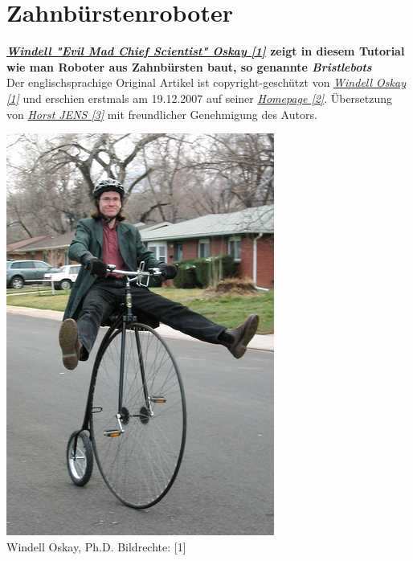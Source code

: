 \section*{Zahnbürstenroboter} 
\label{bristlebot}


\textbf{\href{http://www.evilmadscientist.com/about/}{\textit{Windell "Evil Mad Chief Scientist" Oskay [1]}} zeigt in diesem Tutorial wie man Roboter aus Zahnbürsten baut, so genannte \textit{Bristlebots}} \\

Der englischsprachige Original Artikel ist copyright-geschützt von \href{http://www.evilmadscientist.com/about/}{\textit{Windell Oskay [1]}} und erschien erstmals am 19.12.2007 auf seiner \href{http://www.evilmadscientist.com/go/bristlebot}{\textit{Homepage [2]}}. Übersetzung von \href{http://spielend-programmieren.at}{\textit{Horst JENS [3]}} mit freundlicher Genehmigung des Autors.

\begin{center}
\includegraphics[width=\linewidth]{bristlebot/bristlebot-evilmadscientist.jpg}\\
\footnotesize{Windell Oskay, Ph.D. Bildrechte: [1]}
\end{center}

